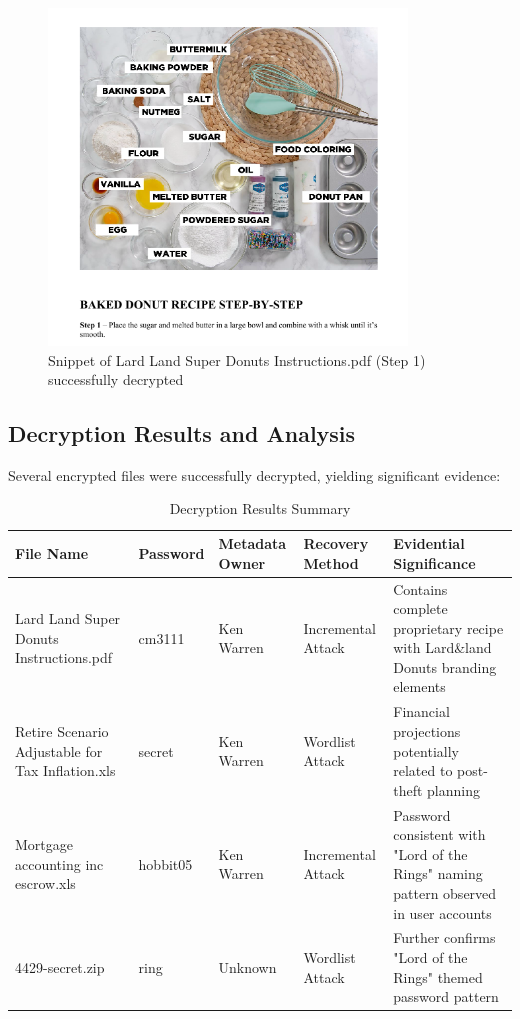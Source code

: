 \begin{figure}[htbp]
    \centering
    \includegraphics[width=0.85\textwidth]{images/Artifact and Evidence Recovery/LardLandPDF.png}
    \caption{Snippet of Lard Land Super Donuts Instructions.pdf (Step 1) successfully decrypted}
    \label{fig:decrypted_pdf}
\end{figure}

\subsection{Decryption Results and Analysis}
Several encrypted files were successfully decrypted, yielding significant evidence:

\begin{table}[htbp]
\centering
\small
\begin{tabular}{|p{4cm}|p{2cm}|p{2cm}|p{2cm}|p{5cm}|}
\hline
\textbf{File Name} & \textbf{Password} & \textbf{Metadata Owner} & \textbf{Recovery Method} & \textbf{Evidential Significance} \\
\hline
Lard Land Super Donuts Instructions.pdf & cm3111 & Ken Warren & Incremental Attack & Contains complete proprietary recipe with Lard\&land Donuts branding elements \\
\hline
Retire Scenario Adjustable for Tax Inflation.xls & secret & Ken Warren & Wordlist Attack & Financial projections potentially related to post-theft planning \\
\hline
Mortgage accounting inc escrow.xls & hobbit05 & Ken Warren & Incremental Attack & Password consistent with "Lord of the Rings" naming pattern observed in user accounts \\
\hline
4429-secret.zip & ring & Unknown & Wordlist Attack & Further confirms "Lord of the Rings" themed password pattern \\
\hline
\end{tabular}
\caption{Decryption Results Summary}
\label{table:decryption_summary}
\end{table}


